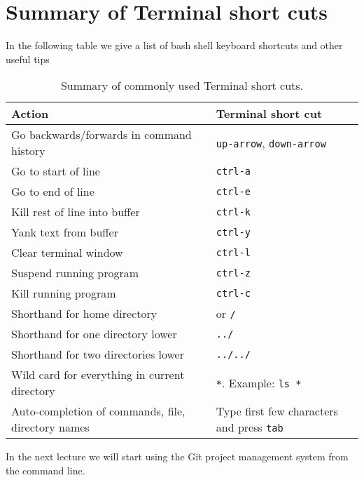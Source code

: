 \section{Summary of Terminal short cuts}

In the following table we give a list of bash shell keyboard shortcuts and other useful tips
\begin{table}[htbp!]
    \centering
    \begin{tabular}{l|l} \hline
      Action & Terminal short cut \\ \hline
         Go backwards/forwards in command history & \texttt{up-arrow}, \texttt{down-arrow} \\
         Go to start of line &  \texttt{ctrl-a}\\ 
         Go to end of line & \texttt{ctrl-e}\\
         Kill rest of line into buffer & \texttt{ctrl-k} \\
         Yank text  from buffer & \texttt{ctrl-y} \\ \hline
         Clear terminal window & \texttt{ctrl-l} \\
         Suspend running program & \texttt{ctrl-z} \\
         Kill running program & \texttt{ctrl-c} \\ \hline
         Shorthand for home directory & \texttt{\mytilde{}} or  \texttt{\mytilde{}/} \\
         Shorthand for one directory lower & \texttt{../} \\ 
         Shorthand for two directories lower & \texttt{../../} \\
         Wild card for everything in current directory & \texttt{*}. Example: \texttt{ls *} \\
         Auto-completion of commands, file, directory names & Type first few characters and press \texttt{tab} \\
    \hline\end{tabular}
    \caption{Summary of commonly used Terminal short cuts.}
    \label{terminalShortcuts.tab}
\end{table}


\noindent In the next lecture we will start using the Git project management system from the command line.

